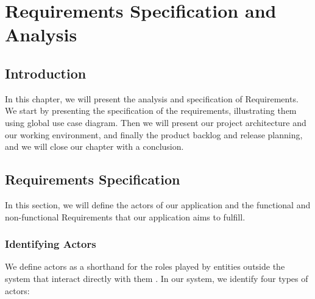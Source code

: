 \chapter{Requirements Specification and Analysis}

\section*{Introduction}

  In this chapter, we will present the analysis and specification of Requirements. We start by presenting the specification of the requirements, illustrating them using global use case diagram. Then we will present our project architecture and our working environment, and finally the product backlog and release planning, and we will close our chapter with a conclusion.

\section{Requirements Specification}

In this section, we will define the actors of our application and the functional and non-functional Requirements that our application aims to fulfill.

\subsection{Identifying Actors}

We define actors as a shorthand for the roles played by entities outside the system that interact directly with them \cite{CockburnUML2002}. In our system, we identify four types of actors:

